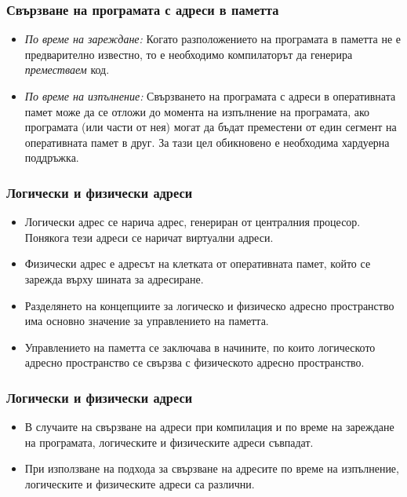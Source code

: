 \documentclass[ignorenonframetext, hyperref=unicode]{beamer}
\begin{document}
\begin{frame}
\frametitle{Свързване на програмата с адреси в паметта}
\begin{itemize}
  \item {\em По време на зареждане:} Когато разположението на програмата в
  паметта не е предварително известно, то е необходимо компилаторът да генерира
  {\em преместваем} код.
  \item {\em По време на изпълнение:} Свързването на програмата с адреси в
  оперативната памет може да се отложи до момента на изпълнение на програмата,
  ако програмата (или части от нея) могат да бъдат преместени от един сегмент на
  оперативната памет в друг. За тази цел обикновено е необходима хардуерна
  поддръжка.
\end{itemize}
\end{frame}

\begin{frame}
\frametitle{Логически и физически адреси}
\begin{itemize}
  \item Логически адрес се нарича адрес, генериран от централния процесор.
  Понякога тези адреси се наричат виртуални адреси.
  \item Физически адрес е адресът на клетката от оперативната памет, който се
  зарежда върху шината за адресиране.
  \item Разделянето на концепциите за логическо и физическо адресно
  пространство има основно значение за управлението на паметта.
  \item Управлението на паметта се заключава в начините, по които логическото
  адресно пространство се свързва с физическото адресно пространство.
\end{itemize}
\end{frame}

\begin{frame}
\frametitle{Логически и физически адреси}
\begin{itemize}
  \item В случаите на свързване на адреси при компилация и по време на
  зареждане на програмата, логическите и физическите адреси съвпадат.
  \item При използване на подхода за свързване на адресите по време на
  изпълнение, логическите и физическите адреси са различни.
\end{itemize}
\end{frame}
\end{document}
